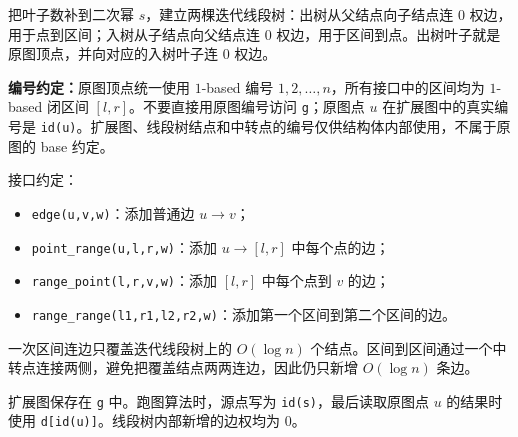 把叶子数补到二次幂 $s$，建立两棵迭代线段树：出树从父结点向子结点连 $0$ 权边，用于点到区间；入树从子结点向父结点连 $0$ 权边，用于区间到点。出树叶子就是原图顶点，并向对应的入树叶子连 $0$ 权边。

\textbf{编号约定：}原图顶点统一使用 $1$-based 编号 $1,2,\ldots,n$，所有接口中的区间均为 $1$-based 闭区间 $[l,r]$。不要直接用原图编号访问 \texttt{g}；原图点 $u$ 在扩展图中的真实编号是 \texttt{id(u)}。扩展图、线段树结点和中转点的编号仅供结构体内部使用，不属于原图的 base 约定。

接口约定：

\begin{itemize}
  \item \texttt{edge(u,v,w)}：添加普通边 $u\to v$；
  \item \texttt{point\_range(u,l,r,w)}：添加 $u\to[l,r]$ 中每个点的边；
  \item \texttt{range\_point(l,r,v,w)}：添加 $[l,r]$ 中每个点到 $v$ 的边；
  \item \texttt{range\_range(l1,r1,l2,r2,w)}：添加第一个区间到第二个区间的边。
\end{itemize}

一次区间连边只覆盖迭代线段树上的 $O(\log n)$ 个结点。区间到区间通过一个中转点连接两侧，避免把覆盖结点两两连边，因此仍只新增 $O(\log n)$ 条边。

扩展图保存在 \texttt{g} 中。跑图算法时，源点写为 \texttt{id(s)}，最后读取原图点 $u$ 的结果时使用 \texttt{d[id(u)]}。线段树内部新增的边权均为 $0$。
